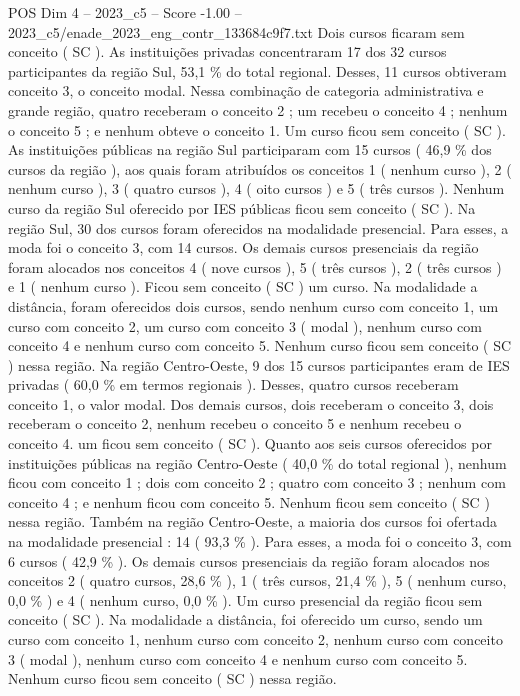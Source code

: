 \begin{textsample}{POS Dim 4 – 2023\_c5 – Score -1.00 – 2023\_c5/enade\_2023\_eng\_contr\_133684c9f7.txt}
Dois cursos ficaram sem conceito ( SC ).
As instituições privadas concentraram 17 dos 32 cursos participantes da região Sul, 53,1 \% do total regional.
Desses, 11 cursos obtiveram conceito 3, o conceito modal.
Nessa combinação de categoria administrativa e grande região, quatro receberam o conceito 2 ; um recebeu o conceito 4 ; nenhum o conceito 5 ; e nenhum obteve o conceito 1.
Um curso ficou sem conceito ( SC ).
As instituições públicas na região Sul participaram com 15 cursos ( 46,9 \% dos cursos da região ), aos quais foram atribuídos os conceitos 1 ( nenhum curso ), 2 ( nenhum curso ), 3 ( quatro cursos ), 4 ( oito cursos ) e 5 ( três cursos ).
Nenhum curso da região Sul oferecido por IES públicas ficou sem conceito ( SC ).
Na região Sul, 30 dos cursos foram oferecidos na modalidade presencial.
Para esses, a moda foi o conceito 3, com 14 cursos.
Os demais cursos presenciais da região foram alocados nos conceitos 4 ( nove cursos ), 5 ( três cursos ), 2 ( três cursos ) e 1 ( nenhum curso ).
Ficou sem conceito ( SC ) um curso.
Na modalidade a distância, foram oferecidos dois cursos, sendo nenhum curso com conceito 1, um curso com conceito 2, um curso com conceito 3 ( modal ), nenhum curso com conceito 4 e nenhum curso com conceito 5.
Nenhum curso ficou sem conceito ( SC ) nessa região.
Na região Centro-Oeste, 9 dos 15 cursos participantes eram de IES privadas ( 60,0 \% em termos regionais ).
Desses, quatro cursos receberam conceito 1, o valor modal.
Dos demais cursos, dois receberam o conceito 3, dois receberam o conceito 2, nenhum recebeu o conceito 5 e nenhum recebeu o conceito 4. um ficou sem conceito ( SC ).
Quanto aos seis cursos oferecidos por instituições públicas na região Centro-Oeste ( 40,0 \% do total regional ), nenhum ficou com conceito 1 ; dois com conceito 2 ; quatro com conceito 3 ; nenhum com conceito 4 ; e nenhum ficou com conceito 5.
Nenhum ficou sem conceito ( SC ) nessa região.
Também na região Centro-Oeste, a maioria dos cursos foi ofertada na modalidade presencial : 14 ( 93,3 \% ).
Para esses, a moda foi o conceito 3, com 6 cursos ( 42,9 \% ).
Os demais cursos presenciais da região foram alocados nos conceitos 2 ( quatro cursos, 28,6 \% ), 1 ( três cursos, 21,4 \% ), 5 ( nenhum curso, 0,0 \% ) e 4 ( nenhum curso, 0,0 \% ).
Um curso presencial da região ficou sem conceito ( SC ).
Na modalidade a distância, foi oferecido um curso, sendo um curso com conceito 1, nenhum curso com conceito 2, nenhum curso com conceito 3 ( modal ), nenhum curso com conceito 4 e nenhum curso com conceito 5.
Nenhum curso ficou sem conceito ( SC ) nessa região.

\end{textsample}
